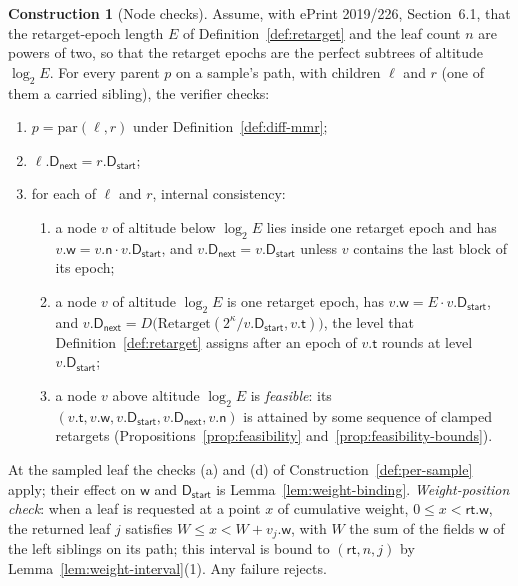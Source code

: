 \documentclass[11pt,a4paper]{article}
\theoremstyle{definition}
\newtheorem{construction}[theorem]{Construction}
\begin{document}
\begin{construction}[Node checks]\label{def:node-checks}
Assume, with ePrint 2019/226, Section~6.1, that the retarget-epoch length
$E$ of Definition~\ref{def:retarget} and the leaf count $n$ are powers of
two, so that the retarget epochs are the perfect subtrees of altitude
$\log_2 E$. For every parent $p$ on a sample's path, with children $\ell$
and $r$ (one of them a carried sibling), the verifier checks:
\begin{enumerate}
\item $p=\mathrm{par}(\ell,r)$ under Definition~\ref{def:diff-mmr};
\item $\ell.\mathsf{D}_{\mathsf{next}}=r.\mathsf{D}_{\mathsf{start}}$;
\item for each of $\ell$ and $r$, internal consistency:
  \begin{enumerate}
  \item a node $v$ of altitude below $\log_2 E$ lies inside one retarget
    epoch and has $v.\mathsf{w}=v.\mathsf{n}\cdot
    v.\mathsf{D}_{\mathsf{start}}$, and
    $v.\mathsf{D}_{\mathsf{next}}=v.\mathsf{D}_{\mathsf{start}}$ unless $v$
    contains the last block of its epoch;
  \item a node $v$ of altitude $\log_2 E$ is one retarget epoch, has
    $v.\mathsf{w}=E\cdot v.\mathsf{D}_{\mathsf{start}}$, and
    $v.\mathsf{D}_{\mathsf{next}}=
    D\bigl(\mathrm{Retarget}(2^\kappa/v.\mathsf{D}_{\mathsf{start}},
    v.\mathsf{t})\bigr)$, the level that Definition~\ref{def:retarget}
    assigns after an epoch of $v.\mathsf{t}$ rounds at level
    $v.\mathsf{D}_{\mathsf{start}}$;
  \item a node $v$ above altitude $\log_2 E$ is \emph{feasible}: its
    $(v.\mathsf{t},\allowbreak v.\mathsf{w},\allowbreak
    v.\mathsf{D}_{\mathsf{start}},\allowbreak
    v.\mathsf{D}_{\mathsf{next}},\allowbreak v.\mathsf{n})$ is attained by some
    sequence of clamped retargets (Propositions~\ref{prop:feasibility}
    and~\ref{prop:feasibility-bounds}).
  \end{enumerate}
\end{enumerate}
At the sampled leaf the checks (a) and (d) of
Construction~\ref{def:per-sample} apply; their effect on $\mathsf{w}$ and
$\mathsf{D}_{\mathsf{start}}$ is Lemma~\ref{lem:weight-binding}.
\emph{Weight-position check}: when a leaf is requested at a point $x$ of
cumulative weight, $0\le x<\mathsf{rt}.\mathsf{w}$, the returned leaf $j$
satisfies $W\le x<W+v_j.\mathsf{w}$, with $W$ the sum of the fields
$\mathsf{w}$ of the left siblings on its path; this interval is bound to
$(\mathsf{rt},n,j)$ by Lemma~\ref{lem:weight-interval}(1). Any failure
rejects.
\end{construction}
\end{document}
